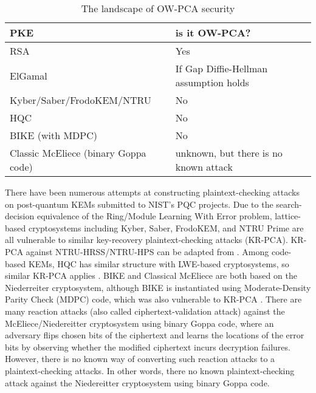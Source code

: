 \documentclass[runningheads]{llncs}
\begin{document}
\begin{table}
    \centering
    \begin{tabular}{|p{17em}|p{12em}|}
        \hline
        \centering\textbf{PKE} & \textbf{is it OW-PCA?} \\
        \hline
        RSA & Yes \\
        \hline
        ElGamal & If Gap Diffie-Hellman assumption holds \\
        \hline
        Kyber/Saber/FrodoKEM/NTRU & No \\
        \hline
        HQC & No \\
        \hline
        BIKE (with MDPC) & No \\
        \hline
        Classic McEliece (binary Goppa code) & unknown, but there is no known attack \\
        \hline
        
    \end{tabular}
    \caption{The landscape of OW-PCA security}\label{tbl:ow-pca-candidates}
\end{table}

There have been numerous attempts at constructing plaintext-checking attacks on post-quantum KEMs submitted to NIST's PQC projects. Due to the search-decision equivalence of the Ring/Module Learning With Error problem, lattice-based cryptosystems including Kyber, Saber, FrodoKEM, and NTRU Prime are all vulnerable to similar key-recovery plaintext-checking attacks (KR-PCA)\cite{DBLP:conf/crypto/00010N20,DBLP:journals/tches/RaviRCB20,DBLP:journals/tches/UenoXTITH22,DBLP:journals/tches/TanakaUXITH23}. KR-PCA against NTRU-HRSS/NTRU-HPS can be adapted from \cite{Hoffstein1999,DBLP:conf/crypto/JaulmesJ00,cryptoeprint:2019/1022,cryptoeprint:2021/168}. Among code-based KEMs, HQC has similar structure with LWE-based cryptosystems, so similar KR-PCA applies \cite{DBLP:conf/acns/Huguenin-Dumittan20}. BIKE and Classical McEliece are both based on the Niederreiter cryptosystem, although BIKE is instantiated using Moderate-Density Parity Check (MDPC) code, which was also vulnerable to KR-PCA \cite{DBLP:conf/asiacrypt/Guo0S16}. There are many reaction attacks (also called ciphertext-validation attack) \cite{DBLP:conf/icics/HallGS99} against the McEliece/Niedereitter cryptosystem using binary Goppa code, where an adversary flips chosen bits of the ciphertext and learns the locations of the error bits by observing whether the modified ciphertext incurs decryption failures. However, there is no known way of converting such reaction attacks to a plaintext-checking attacks. In other words, there no known plaintext-checking attack against the Niedereitter cryptosystem using binary Goppa code.
\end{document}
